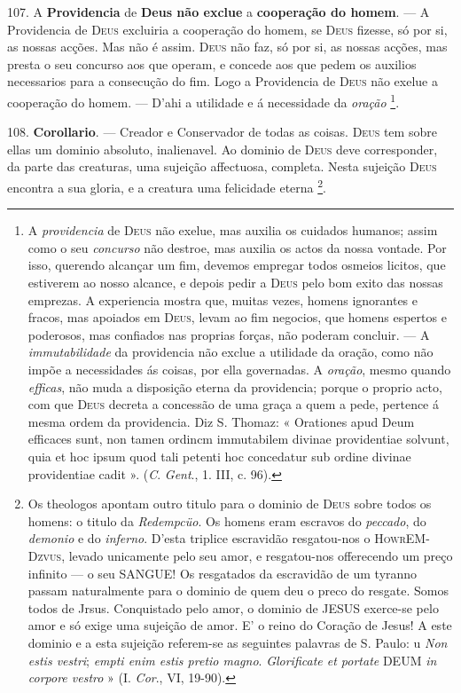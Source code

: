 107. A \textbf{Providencia} de \textbf{Deus não exclue} a \textbf{cooperação do homem}. --- A Providencia de \textsc{Deus} excluiria a cooperação do homem, se \textsc{Deus} fizesse, só por si, as nossas acções. Mas não é assim. \textsc{Deus} não faz, só por si, as nossas acções, mas presta o seu concurso aos que operam, e concede aos que pedem os auxilios necessarios para a consecução do fim. Logo a Providencia de \textsc{Deus} não exelue a cooperação do homem. --- D'ahi a utilidade e á necessidade da \emph{oração} \footnote{A \emph{providencia} de \textsc{Deus} não exelue, mas auxilia os cuidados humanos; assim como o seu \emph{concurso} não destroe, mas auxilia os actos da nossa vontade. Por isso, querendo alcançar um fim, devemos empregar todos osmeios licitos, que estiverem ao nosso alcance, e depois pedir a \textsc{Deus} pelo bom exito das nossas emprezas. A experiencia mostra que, muitas vezes, homens ignorantes e fracos, mas apoiados em \textsc{Deus}, levam ao fim negocios, que homens espertos e poderosos, mas confiados nas proprias forças, não poderam concluir. --- A \emph{immutabilidade} da providencia não exclue a utilidade da oração, como não impõe a necessidades ás coisas, por ella governadas. A \emph{oração}, mesmo quando \emph{efficas}, não muda a disposição eterna da providencia; porque o proprio acto, com que \textsc{Deus} decreta a concessão de uma graça a quem a pede, pertence á mesma ordem da providencia. Diz S. Thomaz: « Orationes apud Deum efficaces sunt, non tamen ordincm immutabilem divinae providentiae solvunt, quia et hoc ipsum quod tali petenti hoc concedatur sub ordine divinae providentiae cadit ». (\emph{C}. \emph{Gent}., 1. III, c. 96).}.

 108. \textbf{Corollario}. --- Creador e Conservador de todas as coisas. \textsc{Deus} tem sobre ellas um dominio absoluto, inalienavel. Ao dominio de \textsc{Deus} deve corresponder, da parte das creaturas, uma sujeição affectuosa, completa. Nesta sujeição \textsc{Deus} encontra a sua gloria, e a creatura uma felicidade eterna \footnote{Os theologos apontam outro titulo para o dominio de \textsc{Deus} sobre todos os homens: o titulo da \emph{Redempcüo}. Os homens eram escravos do \emph{peccado}, do \emph{demonio} e do \emph{inferno}. D'esta triplice escravidão resgatou-nos o \textsc{HowrEM-Dzvus}, levado unicamente pelo seu amor, e resgatou-nos offerecendo um preço infinito --- o seu \textsc{SANGUE}! Os resgatados da escravidão de um tyranno passam naturalmente para o dominio de quem deu o preco do resgate. Somos todos de Jrsus. Conquistado pelo amor, o dominio de \textsc{JESUS} exerce-se pelo amor e só exige uma sujeição de amor. E' o reino do Coração de Jesus! A este dominio e a esta sujeição referem-se as seguintes palavras de S. Paulo: u \emph{Non estis vestri}; \emph{empti enim estis pretio magno}. \emph{Glorificate et portate} DEUM \emph{in corpore vestro} » (I. \emph{Cor}., VI, 19-90).}.

